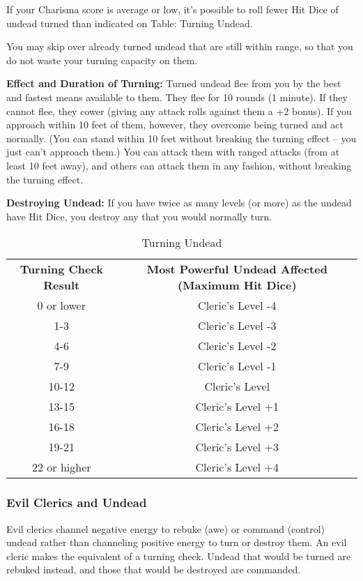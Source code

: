 If your Charisma score is average or low, it's possible to roll fewer Hit Dice 
of undead turned than indicated on Table: Turning Undead.

You may skip over already turned undead that are still within range, so that you 
do not waste your turning capacity on them.

\textbf{Effect and Duration of Turning:} Turned undead flee from you by the best 
and fastest means available to them. They flee for 10 rounds (1 minute). If they 
cannot flee, they cower (giving any attack rolls against them a +2 bonus). If you 
approach within 10 feet of them, however, they overcome being turned and act normally. 
(You can stand within 10 feet without breaking the turning effect -- you just can't 
approach them.) You can attack them with ranged attacks (from at least 10 feet 
away), and others can attack them in any fashion, without breaking the turning 
effect.

\textbf{Destroying Undead:} If you have twice as many levels (or more) as the undead 
have Hit Dice, you destroy any that you would normally turn.

\begin{table}[htb]
\mcinherit
\caption{Turning Undead}
\centering
\begin{tabular}{c c}
\multicolumn{1}{p{3.5cm}}{\textbf{Turning Check Result}} & \multicolumn{1}{p{5cm}}{\textbf{Most Powerful Undead Affected (Maximum Hit Dice)}}\\
0 or lower & Cleric's Level -4\\
1-3 & Cleric's Level -3\\
4-6 & Cleric's Level -2\\
7-9 & Cleric's Level -1\\
10-12 & Cleric's Level\\
13-15 & Cleric's Level +1\\
16-18 & Cleric's Level +2\\
19-21 & Cleric's Level +3\\
22 or higher & Cleric's Level +4\\
\end{tabular}
\end{table}

\subsubsection{Evil Clerics and Undead}

Evil clerics channel negative energy to rebuke (awe) or command (control) undead 
rather than channeling positive energy to turn or destroy them. An evil cleric 
makes the equivalent of a turning check. Undead that would be turned are rebuked 
instead, and those that would be destroyed are commanded.

